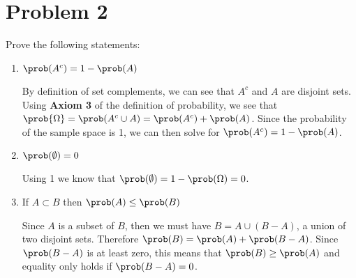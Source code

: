 \documentclass[chapter={01}]{exercises_allofstats}
\begin{document}
\section*{Problem 2}
Prove the following statements:
\begin{enumerate}[leftmargin=*]
    \item $\prob(A^c) = 1 - \prob(A)$
    
    By definition of set complements, we can see that $A^c$ and $A$ are disjoint sets. Using \textbf{Axiom 3} of the definition of probability, we see that $\prob{\Omega} = \prob(A^c\cup A) = \prob(A^c) + \prob(A)$. Since the probability of the sample space is 1, we can then solve for $\prob(A^c) = 1 - \prob(A)$.

    \item $\prob(\emptyset) = 0$
    
    Using 1 we know that $\prob(\emptyset) = 1 - \prob(\Omega) = 0$.

    \item If $A\subset B$ then $\prob(A) \leq \prob(B)$
    
    Since $A$ is a subset of $B$, then we must have $B = A \cup (B - A)$, a union of two disjoint sets. Therefore $\prob(B) = \prob(A) + \prob(B - A)$. Since $\prob(B - A)$ is at least zero, this means that $\prob(B) \geq \prob(A)$ and equality only holds if $\prob(B - A) = 0$.
\end{enumerate}
\end{document}
